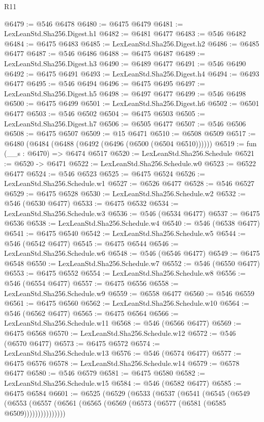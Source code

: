 \begin{lexlean}{R11}
\begin{coremodule}
@6479 := @546 @6478
@6480 := @6475 @6479
@6481 := LexLeanStd.Sha256.Digest.h1
@6482 := @6481 @6477
@6483 := @546 @6482
@6484 := @6475 @6483
@6485 := LexLeanStd.Sha256.Digest.h2
@6486 := @6485 @6477
@6487 := @546 @6486
@6488 := @6475 @6487
@6489 := LexLeanStd.Sha256.Digest.h3
@6490 := @6489 @6477
@6491 := @546 @6490
@6492 := @6475 @6491
@6493 := LexLeanStd.Sha256.Digest.h4
@6494 := @6493 @6477
@6495 := @546 @6494
@6496 := @6475 @6495
@6497 := LexLeanStd.Sha256.Digest.h5
@6498 := @6497 @6477
@6499 := @546 @6498
@6500 := @6475 @6499
@6501 := LexLeanStd.Sha256.Digest.h6
@6502 := @6501 @6477
@6503 := @546 @6502
@6504 := @6475 @6503
@6505 := LexLeanStd.Sha256.Digest.h7
@6506 := @6505 @6477
@6507 := @546 @6506
@6508 := @6475 @6507
@6509 := @15 @6471
@6510 := @6508 @6509
@6517 := @6480 (@6484 (@6488 (@6492 (@6496 (@6500 (@6504 @6510))))))
@6519 := fun (__s : @6470) => @6474 @6517
@6520 := LexLeanStd.Sha256.Schedule
@6521 := @6520 -> @6471
@6522 := LexLeanStd.Sha256.Schedule.w0
@6523 := @6522 @6477
@6524 := @546 @6523
@6525 := @6475 @6524
@6526 := LexLeanStd.Sha256.Schedule.w1
@6527 := @6526 @6477
@6528 := @546 @6527
@6529 := @6475 @6528
@6530 := LexLeanStd.Sha256.Schedule.w2
@6532 := @546 (@6530 @6477)
@6533 := @6475 @6532
@6534 := LexLeanStd.Sha256.Schedule.w3
@6536 := @546 (@6534 @6477)
@6537 := @6475 @6536
@6538 := LexLeanStd.Sha256.Schedule.w4
@6540 := @546 (@6538 @6477)
@6541 := @6475 @6540
@6542 := LexLeanStd.Sha256.Schedule.w5
@6544 := @546 (@6542 @6477)
@6545 := @6475 @6544
@6546 := LexLeanStd.Sha256.Schedule.w6
@6548 := @546 (@6546 @6477)
@6549 := @6475 @6548
@6550 := LexLeanStd.Sha256.Schedule.w7
@6552 := @546 (@6550 @6477)
@6553 := @6475 @6552
@6554 := LexLeanStd.Sha256.Schedule.w8
@6556 := @546 (@6554 @6477)
@6557 := @6475 @6556
@6558 := LexLeanStd.Sha256.Schedule.w9
@6559 := @6558 @6477
@6560 := @546 @6559
@6561 := @6475 @6560
@6562 := LexLeanStd.Sha256.Schedule.w10
@6564 := @546 (@6562 @6477)
@6565 := @6475 @6564
@6566 := LexLeanStd.Sha256.Schedule.w11
@6568 := @546 (@6566 @6477)
@6569 := @6475 @6568
@6570 := LexLeanStd.Sha256.Schedule.w12
@6572 := @546 (@6570 @6477)
@6573 := @6475 @6572
@6574 := LexLeanStd.Sha256.Schedule.w13
@6576 := @546 (@6574 @6477)
@6577 := @6475 @6576
@6578 := LexLeanStd.Sha256.Schedule.w14
@6579 := @6578 @6477
@6580 := @546 @6579
@6581 := @6475 @6580
@6582 := LexLeanStd.Sha256.Schedule.w15
@6584 := @546 (@6582 @6477)
@6585 := @6475 @6584
@6601 := @6525
    (@6529
      (@6533
        (@6537
          (@6541
            (@6545
              (@6549
                (@6553 (@6557 (@6561 (@6565 (@6569 (@6573 (@6577 (@6581 (@6585 @6509)))))))))))))))

\end{coremodule}
\end{lexlean}
